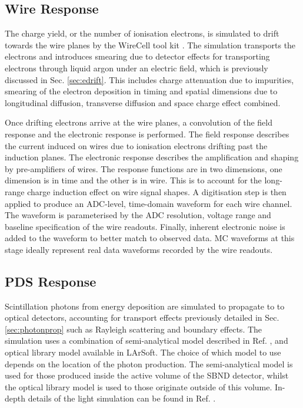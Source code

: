 \subsection{Wire Response}

The charge yield, or the number of ionisation electrons, is simulated to drift towards the wire planes by the WireCell tool kit \cite{wirecell}.
The simulation transports the electrons and introduces smearing due to detector effects for transporting electrons through liquid argon under an electric field, which is previously discussed in Sec. \ref{sec:edrift}.
This includes charge attenuation due to impurities, smearing of the electron deposition in timing and spatial dimensions due to longitudinal diffusion, transverse diffusion and space charge effect combined.

Once drifting electrons arrive at the wire planes, a convolution of the field response and the electronic response is performed.                                                                                                          
The field response describes the current induced on wires due to ionisation electrons drifting past the induction planes.                                                                                                           
The electronic response describes the amplification and shaping by pre-amplifiers of wires.                 
The response functions are in two dimensions, one dimension is in time and the other is in wire.
This is to account for the long-range charge induction effect on wire signal shapes.
A digitisation step is then applied to produce an ADC-level, time-domain waveform for each wire channel.
The waveform is parameterised by the ADC resolution, voltage range and baseline specification of the wire readouts. 
Finally, inherent electronic noise is added to the waveform to better match to observed data.
MC waveforms at this stage ideally represent real data waveforms recorded by the wire readouts.

\subsection{PDS Response}

Scintillation photons from energy deposition are simulated to propagate to to optical detectors, accounting for transport effects previously detailed in Sec. \ref{sec:photonprop} such as Rayleigh scattering and boundary effects.
The simulation uses a combination of semi-analytical model described in Ref. \cite{pds_sim}, and optical library model available in LArSoft.
The choice of which model to use depends on the location of the photon production.
The semi-analytical model is used for those produced inside the active volume of the SBND detector, whilst the optical library model is used to those originate outside of this volume.
In-depth details of the light simulation can be found in Ref. \cite{sbnd_pds_paper}.


